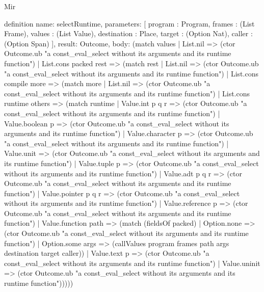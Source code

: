 \begin{lexlean}{Mir}
\begin{semanticmodule}
definition{
  name: selectRuntime,
  parameters: [
    program : Program,
    frames : (List Frame),
    values : (List Value),
    destination : Place,
    target : (Option Nat),
    caller : (Option Span)
  ],
  result: Outcome,
  body: (match values
    | List.nil => (ctor Outcome.ub "a const_eval_select without its arguments and its runtime function")
    | List.cons packed rest => (match rest
      | List.nil => (ctor Outcome.ub "a const_eval_select without its arguments and its runtime function")
      | List.cons compile more => (match more
        | List.nil => (ctor Outcome.ub "a const_eval_select without its arguments and its runtime function")
        | List.cons runtime others => (match runtime
          | Value.int p q r => (ctor Outcome.ub "a const_eval_select without its arguments and its runtime function")
          | Value.boolean p => (ctor Outcome.ub "a const_eval_select without its arguments and its runtime function")
          | Value.character p => (ctor Outcome.ub "a const_eval_select without its arguments and its runtime function")
          | Value.unit => (ctor Outcome.ub "a const_eval_select without its arguments and its runtime function")
          | Value.tuple p => (ctor Outcome.ub "a const_eval_select without its arguments and its runtime function")
          | Value.adt p q r => (ctor Outcome.ub "a const_eval_select without its arguments and its runtime function")
          | Value.pointer p q r => (ctor Outcome.ub "a const_eval_select without its arguments and its runtime function")
          | Value.reference p => (ctor Outcome.ub "a const_eval_select without its arguments and its runtime function")
          | Value.function path => (match (fieldsOf packed)
            | Option.none => (ctor Outcome.ub "a const_eval_select without its arguments and its runtime function")
            | Option.some args => (callValues program frames path args destination target caller))
          | Value.text p => (ctor Outcome.ub "a const_eval_select without its arguments and its runtime function")
          | Value.uninit => (ctor Outcome.ub "a const_eval_select without its arguments and its runtime function")))))
}


\end{semanticmodule}
\end{lexlean}
